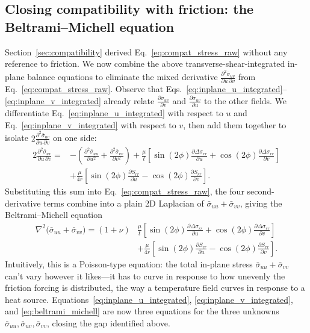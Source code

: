 \documentclass[11pt]{article}
\begin{document}
\subsection{Closing compatibility with friction: the Beltrami--Michell equation}\label{sec:beltrami_michell}
Section~\ref{sec:compatibility} derived Eq.~\eqref{eq:compat_stress_raw} without any reference to friction. We now combine the above transverse-shear-integrated in-plane balance equations to eliminate the mixed derivative $\frac{\partial^2\bar\sigma_{uv}}{\partial u\,\partial v}$ from Eq.~\eqref{eq:compat_stress_raw}. Observe that Eqs.~\eqref{eq:inplane_u_integrated}--\eqref{eq:inplane_v_integrated} already relate $\frac{\partial\bar\sigma_{uv}}{\partial v}$ and $\frac{\partial\bar\sigma_{uv}}{\partial u}$ to the other fields. We differentiate Eq.~\eqref{eq:inplane_u_integrated} with respect to $u$ and Eq.~\eqref{eq:inplane_v_integrated} with respect to $v$, then add them together to isolate $2\frac{\partial^2\bar\sigma_{uv}}{\partial u\,\partial v}$ on one side:
\begin{equation}\label{eq:mixed_elim}
    \begin{aligned}
    2\frac{\partial^2\bar\sigma_{uv}}{\partial u\,\partial v} = &-\left(\frac{\partial^2\bar\sigma_{uu}}{\partial u^2}+\frac{\partial^2\bar\sigma_{vv}}{\partial v^2}\right)
    + \frac{\mu}{t}\left[\sin(2\phi)\frac{\partial\Delta\sigma_{rr}}{\partial u}+\cos(2\phi)\frac{\partial\Delta\sigma_{rr}}{\partial v}\right] \\
    &+ \frac{\mu}{4r}\left[\sin(2\phi)\frac{\partial S_{rr}}{\partial u}-\cos(2\phi)\frac{\partial S_{rr}}{\partial v}\right].
    \end{aligned}
\end{equation}
Substituting this sum into Eq.~\eqref{eq:compat_stress_raw}, the four second-derivative terms combine into a plain 2D Laplacian of $\bar\sigma_{uu}+\bar\sigma_{vv}$, giving the Beltrami--Michell equation
\begin{equation}\label{eq:beltrami_michell}
    \boxed{\begin{aligned}
    \nabla^2\big(\bar\sigma_{uu}+\bar\sigma_{vv}\big) = (1+\nu)&\frac{\mu}{t}\left[\sin(2\phi)\frac{\partial\Delta\sigma_{rr}}{\partial u}+\cos(2\phi)\frac{\partial\Delta\sigma_{rr}}{\partial v}\right] \\
    &+ \frac{\mu}{4r}\left[\sin(2\phi)\frac{\partial S_{rr}}{\partial u}-\cos(2\phi)\frac{\partial S_{rr}}{\partial v}\right].
    \end{aligned}}
\end{equation}
Intuitively, this is a Poisson-type equation: the total in-plane stress $\bar\sigma_{uu}+\bar\sigma_{vv}$ can't vary however it likes---it has to curve in response to how unevenly the friction forcing is distributed, the way a temperature field curves in response to a heat source. 
Equations~\eqref{eq:inplane_u_integrated}, \eqref{eq:inplane_v_integrated}, and \eqref{eq:beltrami_michell} are now three equations for the three unknowns $\bar\sigma_{uu},\bar\sigma_{uv},\bar\sigma_{vv}$, closing the gap identified above.
\end{document}
